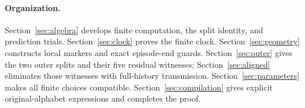 \paragraph{Organization.}
Section~\ref{sec:algebra} develops finite computation, the split identity,
and prediction trials. Section~\ref{sec:clock} proves the finite clock.
Section~\ref{sec:geometry} constructs local markers and exact episode-end
guards. Section~\ref{sec:outer} gives the two outer splits and their five
residual witnesses; Section~\ref{sec:aligned} eliminates those witnesses
with full-history transmission. Section~\ref{sec:parameters} makes all
finite choices compatible. Section~\ref{sec:compilation} gives explicit
original-alphabet expressions and completes the proof.
